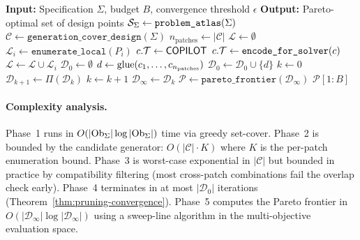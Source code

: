 \documentclass[11pt]{article}
\newcommand{\GenCover}{\texttt{generation\_cover\_design}}
\newcommand{\ProbAtlas}{\texttt{problem\_atlas}}
\begin{document}
\begin{algorithm}[H]
\caption{Multi-Phase Ideation Pipeline with Pruning Convergence}
\label{alg:multi-phase}
\begin{algorithmic}[1]
\STATE \textbf{Input:} Specification $\Sigma$, budget $B$,
       convergence threshold $\epsilon$
\STATE \textbf{Output:} Pareto-optimal set of design points
\STATE
\STATE {}
\STATE $\Site_\Sigma \gets \ProbAtlas(\Sigma)$
\STATE $\mathcal{C} \gets \GenCover(\Sigma)$
\STATE $n_{\text{patches}} \gets |\mathcal{C}|$
\STATE
\STATE {}
\STATE $\mathcal{L} \gets \emptyset$
  \STATE $\mathcal{L}_i \gets \texttt{enumerate\_local}(P_i)$
    \STATE $c.\mathcal{T} \gets \mathsf{COPILOT}$
    \STATE $c.\mathcal{T} \gets \texttt{encode\_for\_solver}(c)$
  \ENDFOR
  \STATE $\mathcal{L} \gets \mathcal{L} \cup \mathcal{L}_i$
\ENDFOR
\STATE
\STATE {}
\STATE $\mathcal{D}_0 \gets \emptyset$
  \STATE $d \gets \mathrm{glue}(c_1, \ldots, c_{n_\text{patches}})$
    \STATE $\mathcal{D}_0 \gets \mathcal{D}_0 \cup \{d\}$
  \ENDIF
\ENDFOR
\STATE
\STATE {}
\STATE $k \gets 0$
\REPEAT
  \STATE $\mathcal{D}_{k+1} \gets \Pi(\mathcal{D}_k)$
  \STATE $k \gets k + 1$
\STATE $\mathcal{D}_\infty \gets \mathcal{D}_k$
\STATE
\STATE {}
\STATE $\mathcal{P} \gets \texttt{pareto\_frontier}(\mathcal{D}_\infty)$
\RETURN $\mathcal{P}[1{:}B]$
\end{algorithmic}
\end{algorithm}

\paragraph{Complexity analysis.}
Phase~1 runs in $O(|\mathrm{Ob}_\Sigma| \log |\mathrm{Ob}_\Sigma|)$ time via
greedy set-cover.  Phase~2 is bounded by the candidate generator:
$O(|\mathcal{C}| \cdot K)$ where $K$ is the per-patch enumeration
bound.  Phase~3 is worst-case exponential in $|\mathcal{C}|$ but
bounded in practice by compatibility filtering (most cross-patch
combinations fail the overlap check early).  Phase~4 terminates in at
most $|\mathcal{D}_0|$ iterations (Theorem~\ref{thm:pruning-convergence}).
Phase~5 computes the Pareto frontier in $O(|\mathcal{D}_\infty|
\log |\mathcal{D}_\infty|)$ using a sweep-line algorithm in the
multi-objective evaluation space.
\end{document}
